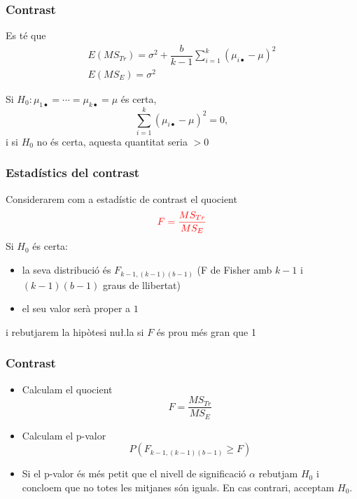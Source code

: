 \documentclass[12pt,t]{beamer}
\newcommand{\red}[1]{\textcolor{red}{#1}}
\renewcommand{\emph}[1]{{\color{red}#1}}
\renewcommand{\geq}{\geqslant}
\theoremstyle{plain}
\theoremstyle{definition}
\begin{document}
\begin{frame}
\frametitle{Contrast}
Es té que
$$
\begin{array}{l}
E(MS_{Tr})=\sigma^2 + \dfrac{b}{k-1}\sum\limits_{i=1}^k (\mu_{i\bullet}-\mu)^2 \\
E(MS_E)=\sigma^2
\end{array}
$$

Si $H_0:\mu_{1\bullet}=\cdots =\mu_{k\bullet}=\mu$ és certa,
$$
\sum\limits_{i=1}^k (\mu_{i\bullet}-\mu)^2 = 0,
$$
i si $H_0$ no és certa, aquesta quantitat seria $>0$
\end{frame}


\begin{frame}
\frametitle{Estadístics del contrast}

Considerarem com a \emph{estadístic de contrast} el quocient 
$$
\red{F=\frac{MS_{Tr}}{MS_E}}
$$
Si $H_0$ és certa:
\medskip

\begin{itemize}
\item la seva distribució és $F_{k-1,(k-1)(b-1)}$ (F de Fisher 
amb $k-1$ i $(k-1)(b-1)$ graus de llibertat)
\medskip

\item el seu valor serà proper a $1$
\end{itemize}
\medskip

i rebutjarem la hipòtesi nu\l.la si $F$ és prou més gran que 1



\end{frame}


\begin{frame}
\frametitle{Contrast}
\begin{itemize}
\item Calculam  el quocient 
$$
F=\frac{MS_{Tr}}{MS_E}
$$

\item Calculam el p-valor
$$
P(F_{k-1,(k-1)(b-1)}\geq F)
$$

\item Si el p-valor és més petit que el nivell de significació $\alpha$  rebutjam $H_0$ i concloem que no totes les mitjanes són iguals. En cas contrari, acceptam $H_0$.
\end{itemize}
\end{frame}
\end{document}
